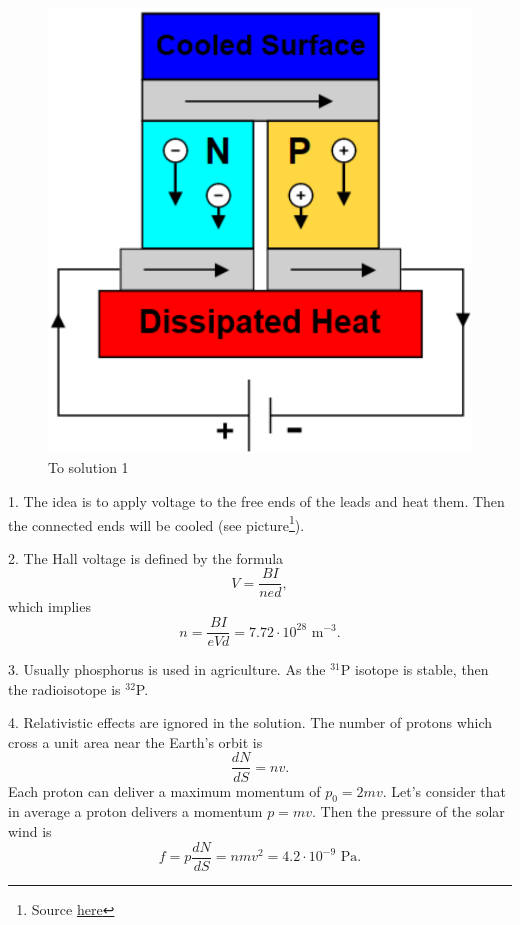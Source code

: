 \documentclass[12pt,a4paper,pdflatex]{disser}
\begin{document}
\begin{figure}
\vspace{-1mm}
\begin{center}
\includegraphics[scale=0.5]{peltier.pdf}
\end{center}
\caption{To solution 1}
\vspace{-10mm}
\end{figure}
1. The idea is to apply voltage to the free ends of the leads and heat them. Then the connected ends will be cooled (see picture\footnote{Source \href{https://upload.wikimedia.org/wikipedia/commons/3/3b/Thermoelectric_Cooler_Diagram.svg}{here}}).

2. The Hall voltage is defined by the formula
$$
  V=\frac{BI}{ned},
$$
which implies
$$
  n=\frac{BI}{eVd}=7.72\cdot 10^{28} \text{ m}^{-3}.
$$

3. Usually phosphorus is used in agriculture. As the $^{31}$P isotope is stable, then the radioisotope is $^{32}$P.

4. Relativistic effects are ignored in the solution. The number of protons which cross a unit area near the Earth's orbit is
$$
  \frac{dN}{dS}=nv.
$$
Each proton can deliver a maximum momentum of $p_0=2mv$. Let's consider that in average a proton delivers a momentum $p=mv$. Then the pressure of the solar wind is
$$
  f=p\frac{dN}{dS}=nmv^2=4.2\cdot 10^{-9} \text{ Pa}.
$$
\end{document}
